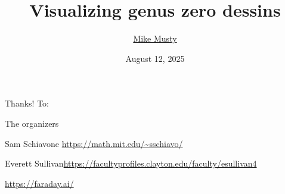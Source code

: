 \documentclass{beamer}
\title[visualizing dessins]{Visualizing genus zero dessins}
\author{\href{https://michaelmusty.github.io/dessins/}{Mike Musty}}
\institute{\href{https://icerm.brown.edu/program/topical_workshop/tw-25-imre}{ICERM 2025}}
\date{August 12, 2025}
\begin{document}
\maketitle

\begin{frame}[plain]{Thanks!}
  To:
  \begin{vfilleditems}
    \item The organizers
    \item Sam Schiavone \newline\url{https://math.mit.edu/~sschiavo/}
    \item Everett Sullivan\newline\url{https://facultyprofiles.clayton.edu/faculty/esullivan4}
    \item \url{https://faraday.ai/}
  \end{vfilleditems}
\end{frame}
\end{document}
